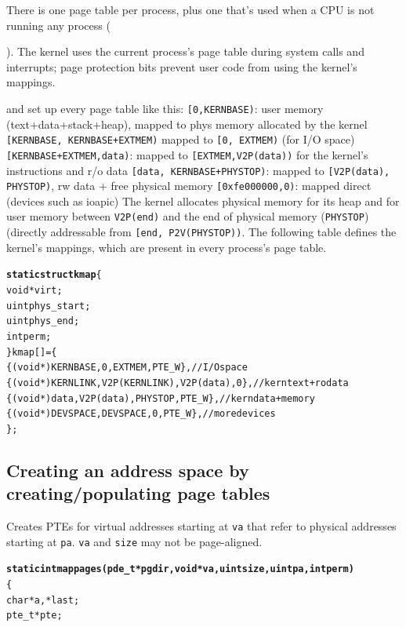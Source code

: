 \documentclass{note}
\begin{document}
\vspace*{0.5cm}

There is one page table per process, plus one that's used when
a CPU is not running any process ({). The kernel uses the
current process's page table during system calls and interrupts;
page protection bits prevent user code from using the kernel's
mappings.

 and  set up every page table like this:
\bit
\w  \verb+[0,KERNBASE)+: user memory (text+data+stack+heap), 
                mapped to
                phys memory allocated by the kernel
\w \verb/[KERNBASE, KERNBASE+EXTMEM)/ mapped to \verb+[0, EXTMEM)+ 
    (for I/O space)
\w \verb/[KERNBASE+EXTMEM,data)/: mapped to \verb+[EXTMEM,V2P(data))+
                for the kernel's instructions and r/o data
\w \verb/[data, KERNBASE+PHYSTOP)/: mapped to \verb+[V2P(data), PHYSTOP)+,
                                  rw data + free physical memory
\w \verb+[0xfe000000,0)+: mapped direct (devices such as ioapic)
\eit
The kernel allocates physical memory for its heap and for user memory
between \verb+V2P(end)+ and the end of physical memory (\verb+PHYSTOP+)
(directly addressable from \verb/[end, P2V(PHYSTOP))/.
The following table defines the kernel's mappings, which are present in
 every process's page table.
\begin{alltt}
  \textcolor{red2}{\textbf{static struct kmap}} \{
    void *virt;
    uint phys_start;
    uint phys_end;
    int perm;
  \} kmap[] = \{
   \{ (void*)KERNBASE, 0,             EXTMEM,    PTE_W\}, // I/O space
   \{ (void*)KERNLINK, V2P(KERNLINK), V2P(data), 0\},     // kern text+rodata
   \{ (void*)data,     V2P(data),     PHYSTOP,   PTE_W\}, // kern data+memory
   \{ (void*)DEVSPACE, DEVSPACE,      0,         PTE_W\}, // more devices
  \};
\end{alltt}

\pagebreak

\subsection{Creating an address space by creating/populating page tables}
Creates PTEs for virtual addresses starting at \verb+va+ that refer to
physical addresses starting at \verb+pa+. \verb+va+ and \verb+size+ may not be
page-aligned.

\begin{alltt}
  \textcolor{red2}{\textbf{static int mappages(pde_t *pgdir, void *va, uint size, uint pa, int perm)}}
  \{
    char *a, *last;
    pte_t *pte;
  

\end{alltt}}
\end{document}

